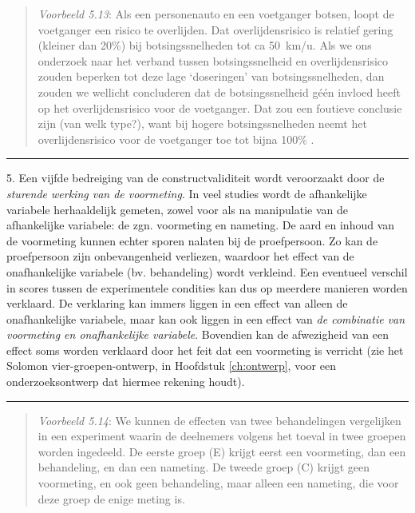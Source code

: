 \documentclass[
]{book}
\begin{document}
\begin{quote}
\emph{Voorbeeld 5.13}: Als een personenauto en een voetganger botsen,
loopt de voetganger een
risico te overlijden. Dat overlijdensrisico is relatief gering (kleiner
dan 20\%) bij botsingssnelheden tot ca 50~km/u. Als we ons onderzoek naar
het verband tussen botsingssnelheid en overlijdensrisico zouden beperken
tot deze lage `doseringen' van botsingssnelheden, dan zouden we wellicht
concluderen dat de botsingssnelheid géén invloed heeft op het
overlijdensrisico voor de voetganger. Dat zou een foutieve conclusie
zijn (van welk type?), want bij hogere botsingssnelheden neemt het
overlijdensrisico voor de voetganger toe tot bijna 100\%
\citep{Rosen11, SWOV12}.
\end{quote}

\begin{center}\rule{0.5\linewidth}{0.5pt}\end{center}

5. Een vijfde bedreiging van de constructvaliditeit wordt veroorzaakt
door de \emph{sturende werking van de voormeting}. In veel studies wordt de
afhankelijke variabele herhaaldelijk gemeten, zowel voor als na
manipulatie van de afhankelijke variabele: de zgn. voormeting en
nameting. De aard en inhoud van de voormeting kunnen echter sporen
nalaten bij de proefpersoon. Zo kan de proefpersoon zijn onbevangenheid
verliezen, waardoor het effect van de onafhankelijke variabele (bv.
behandeling) wordt verkleind. Een eventueel verschil in scores tussen de
experimentele condities kan dus op meerdere manieren worden verklaard.
De verklaring kan immers liggen in een effect van alleen de
onafhankelijke variabele, maar kan ook liggen in een effect van \emph{de
combinatie van voormeting en onafhankelijke variabele}. Bovendien kan de
afwezigheid van een effect soms worden verklaard door het feit dat een
voormeting is verricht (zie het Solomon vier-groepen-ontwerp, in Hoofdstuk \ref{ch:ontwerp}, voor een onderzoeksontwerp dat
hiermee rekening houdt).

\begin{center}\rule{0.5\linewidth}{0.5pt}\end{center}

\begin{quote}
\emph{Voorbeeld 5.14}: We kunnen de effecten van twee behandelingen vergelijken in een
experiment waarin de deelnemers volgens het toeval in twee groepen
worden ingedeeld. De eerste groep (E) krijgt eerst een voormeting, dan
een behandeling, en dan een nameting. De tweede groep (C) krijgt geen
voormeting, en ook geen behandeling, maar alleen een nameting, die voor
deze groep de enige meting is.
\end{quote}
\end{document}
